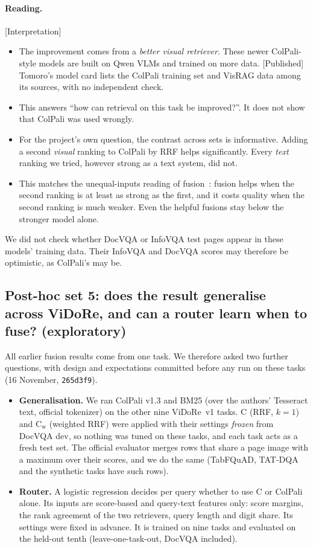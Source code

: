 \documentclass[11pt,a4paper]{article}
\newcommand{\lbl}[2]{\textsf{\scriptsize\textcolor{#1}{[#2]}}}
\newcommand{\Pub}{\lbl{tagP}{Published}}
\newcommand{\Int}{\lbl{tagI}{Interpretation}}
\begin{document}
\paragraph{Reading.} \Int{}
\begin{itemize}
  \item The improvement comes from a \emph{better visual retriever}. These newer ColPali-style models are built on Qwen VLMs and trained on more data. \Pub{} Tomoro's model card lists the ColPali training set and VisRAG data among its sources, with no independent check.
  \item This answers ``how can retrieval on this task be improved?''. It does not show that ColPali was used wrongly.
  \item For the project's own question, the contrast across sets is informative. Adding a second \emph{visual} ranking to ColPali by RRF helps significantly. Every \emph{text} ranking we tried, however strong as a text system, did not.
  \item This matches the unequal-inputs reading of fusion~\cite{bruch}: fusion helps when the second ranking is at least as strong as the first, and it costs quality when the second ranking is much weaker. Even the helpful fusions stay below the stronger model alone.
\end{itemize}
We did not check whether DocVQA or InfoVQA test pages appear in these models' training data. Their InfoVQA and DocVQA scores may therefore be optimistic, as ColPali's may be.

\subsection{Post-hoc set 5: does the result generalise across ViDoRe, and can a router learn when to fuse? (exploratory)}
\label{sec:posthoc5}
All earlier fusion results come from one task. We therefore asked two further questions, with design and expectations committed before any run on these tasks (16 November, \texttt{265d3f9}).
\begin{itemize}
  \item \textbf{Generalisation.} We ran ColPali v1.3 and BM25 (over the authors' Tesseract text, official tokenizer) on the other nine ViDoRe~v1 tasks. C (RRF, $k{=}1$) and C$_\text{w}$ (weighted RRF) were applied with their settings \emph{frozen} from DocVQA dev, so nothing was tuned on these tasks, and each task acts as a fresh test set. The official evaluator merges rows that share a page image with a maximum over their scores, and we do the same (TabFQuAD, TAT-DQA and the synthetic tasks have such rows).
  \item \textbf{Router.} A logistic regression decides per query whether to use C or ColPali alone. Its inputs are score-based and query-text features only: score margins, the rank agreement of the two retrievers, query length and digit share. Its settings were fixed in advance. It is trained on nine tasks and evaluated on the held-out tenth (leave-one-task-out, DocVQA included).
\end{itemize}
\end{document}
